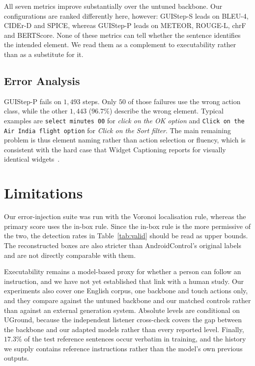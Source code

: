 \documentclass[runningheads,a4paper]{llncs}
\begin{document}
All seven metrics improve substantially over the untuned backbone. Our configurations are ranked
differently here, however: GUIStep-S leads on BLEU-4, CIDEr-D and SPICE, whereas GUIStep-P leads
on METEOR, ROUGE-L, chrF and BERTScore. None of these metrics can tell whether the sentence
identifies the intended element. We read them as a complement to executability rather than as a
substitute for it.

\subsection{Error Analysis}
\label{sec:analysis}

GUIStep-P fails on $1{,}493$ steps. Only $50$ of those failures use the wrong action class,
while the other $1{,}443$ ($96.7\%$) describe the wrong element.
Typical examples are \texttt{select minutes 00} for \emph{click on the OK option} and
\texttt{Click on the Air India flight option} for \emph{Click on the Sort filter}. The main
remaining problem is thus element naming rather than action selection or fluency, which is
consistent with the hard case that Widget Captioning reports for visually identical
widgets~\cite{widgetcap}.

\section{Limitations}
\label{sec:limits}

Our error-injection suite was run with the Voronoi localisation rule, whereas the primary score
uses the in-box rule. Since the in-box rule is the more permissive of the two, the detection
rates in Table~\ref{tab:valid} should be read as upper bounds. The reconstructed boxes are also
stricter than AndroidControl's original labels and are not directly comparable with them.

Executability remains a model-based proxy for whether a person can follow an instruction, and we
have not yet established that link with a human study. Our experiments also cover one English
corpus, one backbone and touch actions only, and they compare against the untuned backbone and our
matched controls rather than against an external generation system. Absolute levels are
conditional on UGround, because the independent listener cross-check covers the gap between the
backbone and our adapted models rather than every reported level. Finally, $17.3\%$ of the test
reference sentences occur verbatim in training, and the history we supply contains reference
instructions rather than the model's own previous outputs.
\end{document}
